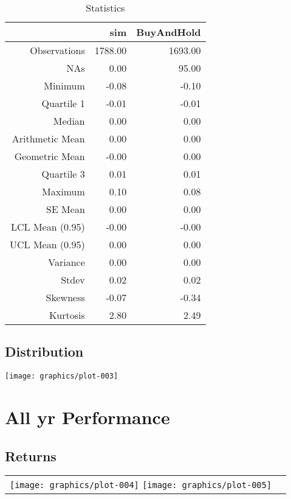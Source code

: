 \documentclass{article}
\begin{document}
\begin{table}[ht]
\begin{center}
\caption{Statistics}
\begin{tabular}{rrr}
  \hline
 & sim & BuyAndHold \\ 
  \hline
Observations & 1788.00 & 1693.00 \\ 
  NAs & 0.00 & 95.00 \\ 
  Minimum & -0.08 & -0.10 \\ 
  Quartile 1 & -0.01 & -0.01 \\ 
  Median & 0.00 & 0.00 \\ 
  Arithmetic Mean & 0.00 & 0.00 \\ 
  Geometric Mean & -0.00 & 0.00 \\ 
  Quartile 3 & 0.01 & 0.01 \\ 
  Maximum & 0.10 & 0.08 \\ 
  SE Mean & 0.00 & 0.00 \\ 
  LCL Mean (0.95) & -0.00 & -0.00 \\ 
  UCL Mean (0.95) & 0.00 & 0.00 \\ 
  Variance & 0.00 & 0.00 \\ 
  Stdev & 0.02 & 0.02 \\ 
  Skewness & -0.07 & -0.34 \\ 
  Kurtosis & 2.80 & 2.49 \\ 
   \hline
\end{tabular}
\end{center}
\end{table}
\subsection{Distribution}

\texttt{[image: graphics/plot-003]}

\section{All yr Performance}
\subsection{Returns}
\begin{tabular}{cc}
\texttt{[image: graphics/plot-004]}
\texttt{[image: graphics/plot-005]}
\end{tabular}
\end{document}
